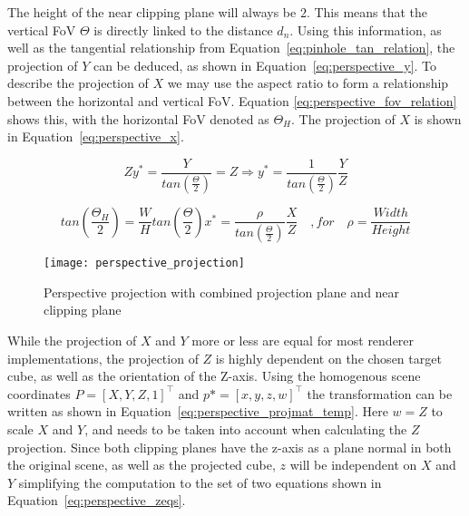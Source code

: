 The height of the near clipping plane will always be $2$. This means that the vertical FoV $\Theta$ is directly linked to the distance $d_n$.  Using this information, as well as the tangential relationship from Equation~\eqref{eq:pinhole_tan_relation}, the projection of $Y$ can be deduced, as shown in Equation~\eqref{eq:perspective_y}. To describe the projection of $X$ we may use the aspect ratio to form a relationship between the horizontal and vertical FoV. Equation \eqref{eq:perspective_fov_relation} shows this, with the horizontal FoV denoted as $\Theta_H$. The projection of $X$ is shown in Equation~\eqref{eq:perspective_x}.

\begin{equation}
    Zy^* = \frac{Y}{tan\left(\frac{\Theta}{2}\right)} = Z \Rightarrow y^* = \frac{1}{tan\left(\frac{\Theta}{2}\right)}\frac{Y}{Z}
    \label{eq:perspective_y}
\end{equation}

\begin{subequations}
\begin{equation}
    tan\left(\frac{\Theta_H}{2}\right) = \frac{W}{H}tan\left(\frac{\Theta}{2}\right)
    \label{eq:perspective_fov_relation}
\end{equation}
\begin{equation}
    x^* = \frac{\rho}{tan\left(\frac{\Theta}{2}\right)}\frac{X}{Z} \quad , for \quad \rho = \frac{Width}{Height}
    \label{eq:perspective_x}
\end{equation}
\label{eq:perspective_x_fovrel}
\end{subequations}


\begin{figure}[!htb]
    \centering
    \texttt{[image: perspective\_projection]}
    \caption{Perspective projection with combined projection plane and near clipping plane}
    \label{fig:perspective_projection}
\end{figure}

While the projection of $X$ and $Y$ more or less are equal for most renderer implementations, the projection of $Z$ is highly dependent on the chosen target cube, as well as the orientation of the Z-axis. Using the homogenous scene coordinates $P = [X,Y,Z,1]^\top$ and $p* = [x,y,z,w]^\top$ the transformation can be written as shown in Equation~\eqref{eq:perspective_projmat_temp}. Here $w = Z$ to scale $X$ and $Y$, and needs to be taken into account when calculating the $Z$ projection. Since both clipping planes have the z-axis as a plane normal in both the original scene, as well as the projected cube, $z$ will be independent on $X$ and $Y$ simplifying the computation to the set of two equations shown in Equation~\eqref{eq:perspective_zeqs}.


